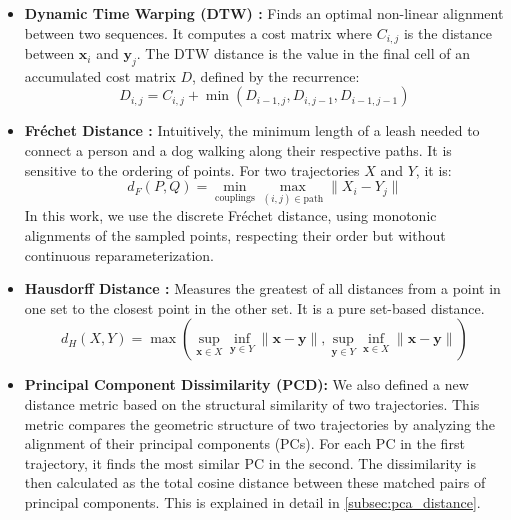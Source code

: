 \documentclass[a4paper,12pt]{article}
\begin{document}
\begin{itemize}
    \item \textbf{Dynamic Time Warping (DTW) \cite{SalvadorChan2007}:} Finds an optimal non-linear alignment between two sequences. It computes a cost matrix where $C_{i,j}$ is the distance between $\mathbf{x}_i$ and $\mathbf{y}_j$. The DTW distance is the value in the final cell of an accumulated cost matrix $D$, defined by the recurrence:
    \begin{equation}
        D_{i,j} = C_{i,j} + \min(D_{i-1, j}, D_{i, j-1}, D_{i-1, j-1})
    \end{equation}
    \item \textbf{Fréchet Distance \cite{Denaxas2023} \cite{EiterMannila1994}:} Intuitively, the minimum length of a leash needed to connect a person and a dog walking along their respective paths. It is sensitive to the ordering of points. For two trajectories $X$ and $Y$, it is:
        \begin{equation}
            d_F(P, Q) = \min_{\text{couplings}} \max_{(i, j) \in \text{path}} \| X_i - Y_j \|
        \end{equation}
        In this work, we use the discrete Fréchet distance, using monotonic alignments of the sampled points, respecting their order but without continuous reparameterization.
    \item \textbf{Hausdorff Distance \cite{SciPyDirectedHausdorff}:} Measures the greatest of all distances from a point in one set to the closest point in the other set. It is a pure set-based distance.
    \begin{equation}
        d_H(X, Y) = \max \left( \sup_{\mathbf{x} \in X} \inf_{\mathbf{y} \in Y} \|\mathbf{x}-\mathbf{y}\|, \sup_{\mathbf{y} \in Y} \inf_{\mathbf{x} \in X} \|\mathbf{x}-\mathbf{y}\| \right)
    \end{equation}
    \item \textbf{Principal Component Dissimilarity (PCD):} We also defined a new distance metric based on the structural similarity of two trajectories. This metric compares the geometric structure of two trajectories by analyzing the alignment of their principal components (PCs). For each PC in the first trajectory, it finds the most similar PC in the second. The dissimilarity is then calculated as the total cosine distance between these matched pairs of principal components. This is explained in detail in \ref{subsec:pca_distance}.


\end{itemize}
\end{document}
